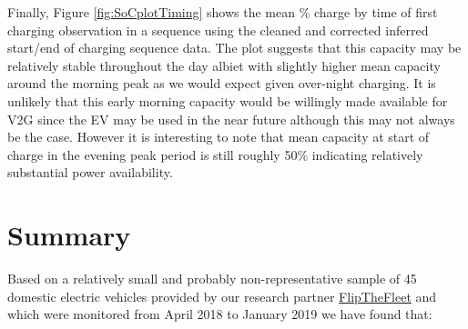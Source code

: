\documentclass[]{article}
\begin{document}
Finally, Figure \ref{fig:SoCplotTiming} shows the mean \% charge by time of first charging observation in a sequence using the cleaned and corrected inferred start/end of charging sequence data. The plot suggests that this capacity may be relatively stable throughout the day albiet with slightly higher mean capacity around the morning peak as we would expect given over-night charging. It is unlikely that this early morning capacity would be willingly made available for V2G since the EV may be used in the near future although this may not always be the case. However it is interesting to note that mean capacity at start of charge in the evening peak period is still roughly 50\% indicating relatively substantial power availability.

\hypertarget{summary}{%
\section{Summary}\label{summary}}

Based on a relatively small and probably non-representative sample of 45 domestic electric vehicles provided by our research partner \href{https://flipthefleet.org/}{FlipTheFleet} and which were monitored from April 2018 to January 2019 we have found that:
\end{document}
